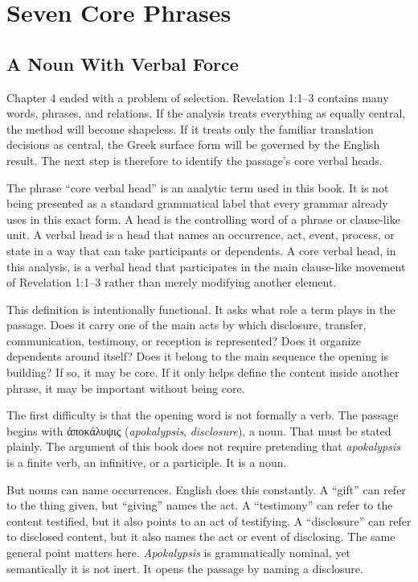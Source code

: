\chapter{Seven Core Phrases}

\section{A Noun With Verbal Force}

Chapter 4 ended with a problem of selection. Revelation 1:1--3 contains many words, phrases, and relations. If the analysis treats everything as equally central, the method will become shapeless. If it treats only the familiar translation decisions as central, the Greek surface form will be governed by the English result. The next step is therefore to identify the passage's core verbal heads.

The phrase ``core verbal head'' is an analytic term used in this book. It is not being presented as a standard grammatical label that every grammar already uses in this exact form. A head is the controlling word of a phrase or clause-like unit. A verbal head is a head that names an occurrence, act, event, process, or state in a way that can take participants or dependents. A core verbal head, in this analysis, is a verbal head that participates in the main clause-like movement of Revelation 1:1--3 rather than merely modifying another element.

This definition is intentionally functional. It asks what role a term plays in the passage. Does it carry one of the main acts by which disclosure, transfer, communication, testimony, or reception is represented? Does it organize dependents around itself? Does it belong to the main sequence the opening is building? If so, it may be core. If it only helps define the content inside another phrase, it may be important without being core.

The first difficulty is that the opening word is not formally a verb. The passage begins with \textgreek{ἀποκάλυψις} (\textit{apokalypsis}, \textit{disclosure}), a noun. That must be stated plainly. The argument of this book does not require pretending that \textit{apokalypsis} is a finite verb, an infinitive, or a participle. It is a noun.

But nouns can name occurrences. English does this constantly. A ``gift'' can refer to the thing given, but ``giving'' names the act. A ``testimony'' can refer to the content testified, but it also points to an act of testifying. A ``disclosure'' can refer to disclosed content, but it also names the act or event of disclosing. The same general point matters here. \textit{Apokalypsis} is grammatically nominal, yet semantically it is not inert. It opens the passage by naming a disclosure.

